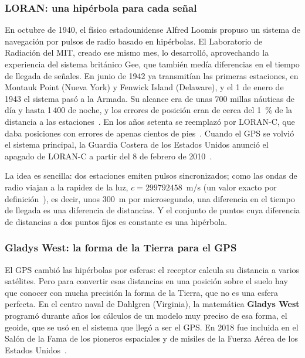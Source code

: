 \documentclass[11pt]{article}
\begin{document}
\subsubsection*{LORAN: una hipérbola para cada señal}

En octubre de 1940, el físico estadounidense Alfred Loomis propuso un sistema de
navegación por pulsos de radio basado en hipérbolas. El Laboratorio de Radiación del
MIT, creado ese mismo mes, lo desarrolló, aprovechando la experiencia del sistema
británico Gee, que también medía diferencias en el tiempo de llegada de señales. En
junio de 1942 ya transmitían las primeras estaciones, en Montauk Point (Nueva York) y
Fenwick Island (Delaware), y el 1 de enero de 1943 el sistema pasó a la
Armada. Su alcance era de unas 700 millas náuticas de día y hasta 1\,400 de noche, y
los errores de posición eran de cerca del 1~\% de la distancia a las
estaciones~\cite{merrill}. En los años setenta se reemplazó por LORAN-C, que daba
posiciones con errores de apenas cientos de pies~\cite{noaa}. Cuando el GPS se
volvió el sistema principal, la Guardia Costera de los Estados Unidos anunció el
apagado de LORAN-C a partir del 8 de febrero de 2010~\cite{fedreg}.

La idea es sencilla: dos estaciones emiten pulsos sincronizados; como las ondas de
radio viajan a la rapidez de la luz, $c = \num{299792458}$~m/s (un valor
exacto por definición~\cite{nist}), es decir, unos $300$~m por microsegundo, una
diferencia en el tiempo de llegada es una diferencia de distancias. Y el conjunto de
puntos cuya diferencia de distancias a dos puntos fijos es constante es una
hipérbola.

\subsubsection*{Gladys West: la forma de la Tierra para el GPS}

El GPS cambió las hipérbolas por esferas: el receptor calcula su distancia a varios
satélites. Pero para convertir esas distancias en una posición sobre el suelo hay
que conocer con mucha precisión la forma de la Tierra, que no es una esfera
perfecta. En el centro naval de Dahlgren (Virginia), la matemática \textbf{Gladys
West} programó durante años los cálculos de un modelo muy preciso de esa forma, el
geoide, que se usó en el sistema que llegó a ser el GPS. En 2018 fue incluida en el
Salón de la Fama de los pioneros espaciales y de misiles de la Fuerza Aérea de los
Estados Unidos~\cite{west}.
\end{document}
